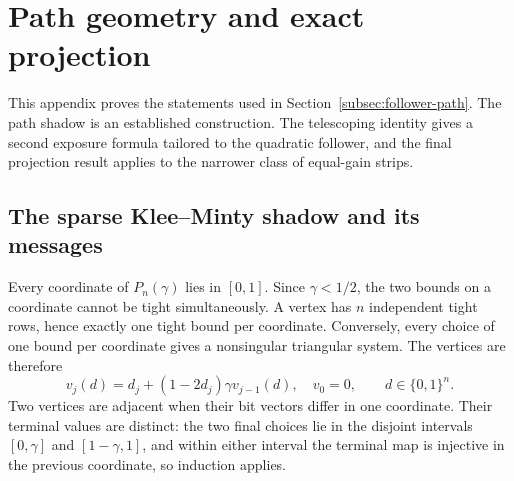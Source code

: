 \section{Path geometry and exact projection}\label{app:path-geometry}
This appendix proves the statements used in Section~\ref{subsec:follower-path}.
The path shadow is an established construction. The telescoping identity gives
a second exposure formula tailored to the quadratic follower, and the final
projection result applies to the narrower class of equal-gain strips.

\subsection{The sparse Klee--Minty shadow and its messages}
\label{app:klee-shadow}
Every coordinate of \(P_n(\gamma)\) lies in \([0,1]\). Since \(\gamma<1/2\),
the two bounds on a coordinate cannot be tight simultaneously. A vertex has
\(n\) independent tight rows, hence exactly one tight bound per coordinate.
Conversely, every choice of one bound per coordinate gives a nonsingular
triangular system. The vertices are therefore
\begin{equation}\label{eq:klee-vertices}
 v_j(d)=d_j+(1-2d_j)\gamma v_{j-1}(d),\quad v_0=0,
 \qquad d\in\{0,1\}^n.
\end{equation}
Two vertices are adjacent when their bit vectors differ in one coordinate.
Their terminal values are distinct: the two final choices lie in the disjoint
intervals \([0,\gamma]\) and \([1-\gamma,1]\), and within either interval
the terminal map is injective in the previous coordinate, so induction
applies.

